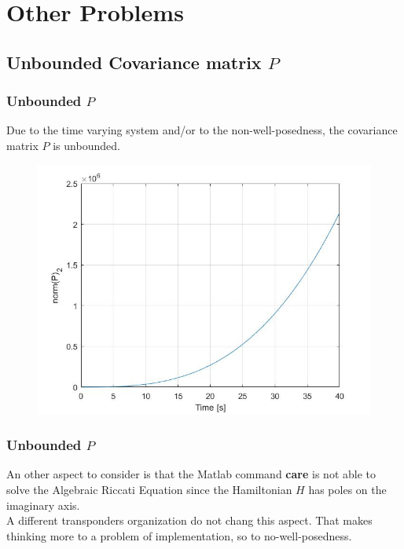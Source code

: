 \documentclass{beamer}
\begin{document}
	
	
	
	
\section{Other Problems}
\subsection{Unbounded Covariance matrix $P$}
	\begin{frame}
		\frametitle{Unbounded $P$}
		Due to the time varying system and/or to the non-well-posedness, the covariance matrix $P$ is unbounded.
		\begin{figure}[H]
			\includegraphics[scale=0.3]{pric}
		\end{figure} 
	\end{frame}
	
	\begin{frame}
		\frametitle{Unbounded $P$}
		An other aspect to consider is that the Matlab command \textbf{care} is not able to solve the Algebraic Riccati Equation since the Hamiltonian $H$ has poles on the imaginary axis.\\ A different transponders organization do not chang this aspect.
		That makes thinking more to a problem of implementation, so to no-well-posedness.
	\end{frame}
\end{document}
